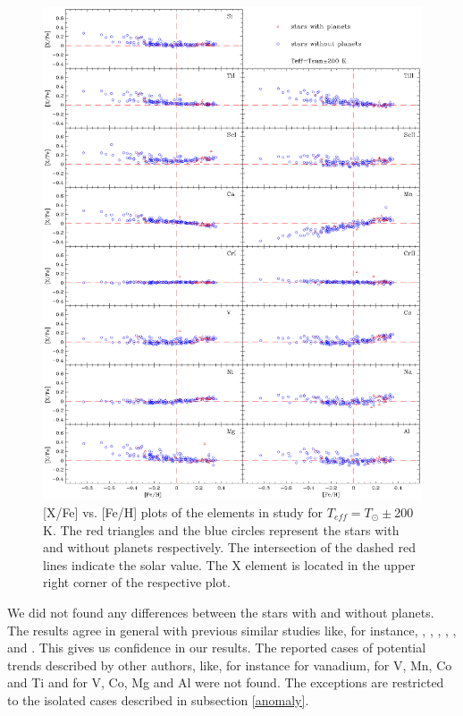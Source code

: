 \documentclass[dvips,12pt,a4paper]{report}
\begin{document}
{{\begin{figure}[h!]
\centering
\includegraphics[trim=0cm 2cm 0cm 1cm,clip,width=15 cm]{pics/parte4/xfefehfinal/xfefehtsolfinal.eps}
\caption[abundance gfx for solar temperatures]{[X/Fe] vs. [Fe/H] plots of the elements in study for $T_{eff}=T_\odot\pm$200 K. The red triangles and the blue circles represent the stars with and without planets respectively. The intersection of the dashed red lines indicate the solar value. The X element is located in the upper right corner of the respective plot.}
\label{xfefeh2}
\end{figure}

We did not found any differences between the stars with and without planets. The results agree in general with previous similar studies like, for instance, \citet{Gonzalez-2001}, \citet{Takeda-2001},  \citet{Sadakane-2002}, \citet{Bodaghee-2003}, \citet{Beirao-2005}, \citet{Fischer-2005} and \citet{Gilli-2006}. This gives us confidence in our results. The reported cases of potential trends described by other authors, like, for instance \citet{Sadakane-2002} for vanadium, \citet{Bodaghee-2003} for V, Mn, Co and Ti and \citet{Gilli-2006} for V, Co, Mg and Al were not found. The exceptions are restricted to the isolated cases described in subsection \ref{anomaly}. %

}}
\end{document}
